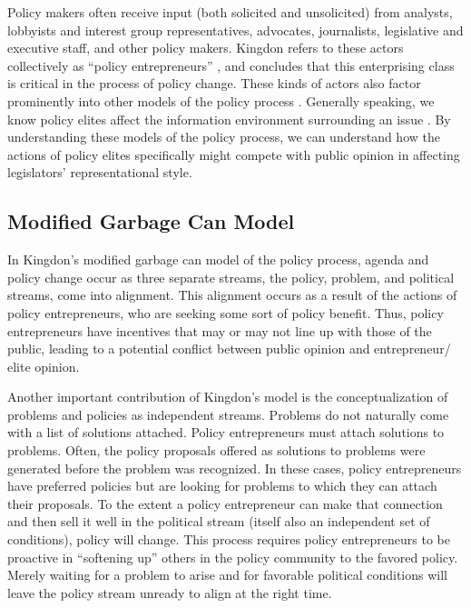 Policy makers often receive input (both solicited and unsolicited) from analysts, lobbyists and interest group representatives, advocates, journalists, legislative and executive staff, and other policy makers. Kingdon refers to these actors collectively as ``policy entrepreneurs'' \citep{Kingdon1995}, and concludes that this enterprising class is critical in the process of policy change. These kinds of actors also factor prominently into other models of the policy process \citep{Sabatier1988,Weissert2008}. Generally speaking, we know policy elites affect the information environment surrounding an issue \citep{Weissert2008,Zaller1992a,Kingdon1995,Sabatier1988}. By understanding these models of the policy process, we can understand how the actions of policy elites specifically might compete with public opinion in affecting legislators' representational style.

\subsection*{Modified Garbage Can Model}
In Kingdon's \citeyearpar{Kingdon1995} modified garbage can model of the policy process, agenda and policy change occur as three separate streams, the policy, problem, and political streams, come into alignment. This alignment occurs as a result of the actions of policy entrepreneurs, who are seeking some sort of policy benefit. Thus, policy entrepreneurs have incentives that may or may not line up with those of the public, leading to a potential conflict between public opinion and entrepreneur/ elite opinion.

Another important contribution of Kingdon's model is the conceptualization of problems and policies as independent streams. Problems do not naturally come with a list of solutions attached. Policy entrepreneurs must attach solutions to problems. Often, the policy proposals offered as solutions to problems were generated before the problem was recognized. In these cases, policy entrepreneurs have preferred policies but are looking for problems to which they can attach their proposals. To the extent a policy entrepreneur can make that connection and then sell it well in the political stream (itself also an independent set of conditions), policy will change. This process requires policy entrepreneurs to be proactive in ``softening up'' others in the policy community to the favored policy. Merely waiting for a problem to arise and for favorable political conditions will leave the policy stream unready to align at the right time. 

